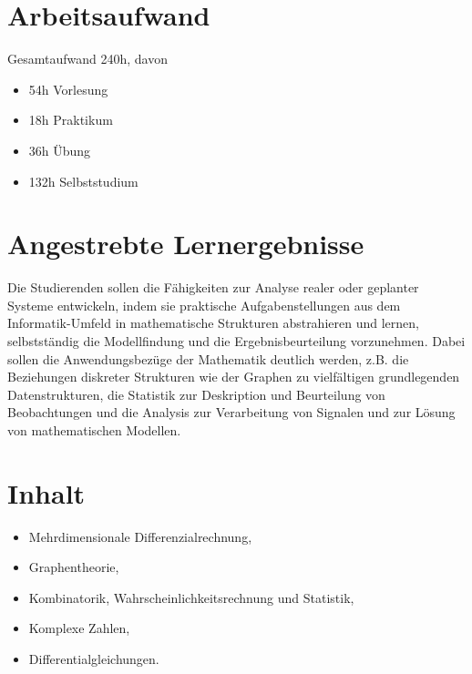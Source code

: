 \hypertarget{arbeitsaufwandpathlabel....srcmodulbeschreibungen-bachelor-bpo5ba_mathematik2}{%
\section*{Arbeitsaufwand\label{../../src/modulbeschreibungen-bachelor-bpo5/BA_Mathematik2}}\label{arbeitsaufwandpathlabel....srcmodulbeschreibungen-bachelor-bpo5ba_mathematik2}}

Gesamtaufwand 240h, davon

\begin{itemize}
\tightlist
\item
  54h Vorlesung
\item
  18h Praktikum
\item
  36h Übung
\item
  132h Selbststudium
\end{itemize}

\hypertarget{angestrebte-lernergebnissepathlabel....srcmodulbeschreibungen-bachelor-bpo5ba_mathematik2}{%
\section*{Angestrebte
Lernergebnisse\label{../../src/modulbeschreibungen-bachelor-bpo5/BA_Mathematik2}}\label{angestrebte-lernergebnissepathlabel....srcmodulbeschreibungen-bachelor-bpo5ba_mathematik2}}

Die Studierenden sollen die Fähigkeiten zur Analyse realer oder
geplanter Systeme entwickeln, indem sie praktische Aufgabenstellungen
aus dem Informatik-Umfeld in mathematische Strukturen abstrahieren und
lernen, selbstständig die Modellfindung und die Ergebnisbeurteilung
vorzunehmen. Dabei sollen die Anwendungsbezüge der Mathematik deutlich
werden, z.B. die Beziehungen diskreter Strukturen wie der Graphen zu
vielfältigen grundlegenden Datenstrukturen, die Statistik zur
Deskription und Beurteilung von Beobachtungen und die Analysis zur
Verarbeitung von Signalen und zur Lösung von mathematischen Modellen.

\hypertarget{inhaltpathlabel....srcmodulbeschreibungen-bachelor-bpo5ba_mathematik2}{%
\section*{Inhalt\label{../../src/modulbeschreibungen-bachelor-bpo5/BA_Mathematik2}}\label{inhaltpathlabel....srcmodulbeschreibungen-bachelor-bpo5ba_mathematik2}}

\begin{itemize}
\tightlist
\item
  Mehrdimensionale Differenzialrechnung,
\item
  Graphentheorie,
\item
  Kombinatorik, Wahrscheinlichkeitsrechnung und Statistik,
\item
  Komplexe Zahlen,
\item
  Differentialgleichungen.
\end{itemize}

